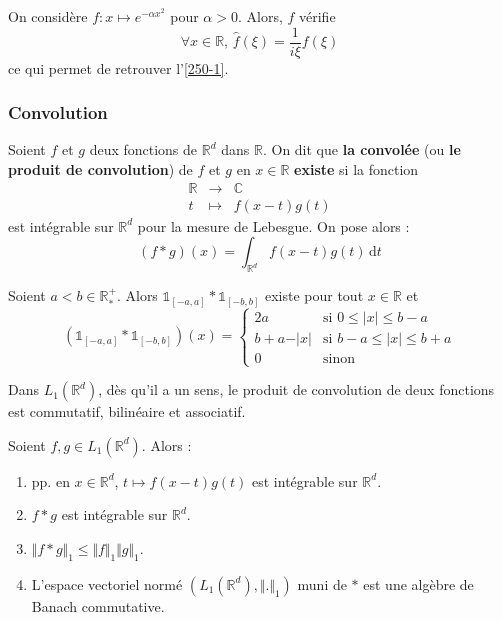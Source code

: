 
	\begin{application}
		On considère $f : x \mapsto e^{- \alpha x^2}$ pour $\alpha > 0$. Alors, $f$ vérifie
		\[ \forall x \in \mathbb{R}, \, \widehat{f}(\xi) = \frac{1}{i \xi} f(\xi) \]
		ce qui permet de retrouver l'\cref{250-1}.
	\end{application}

	\subsubsection{Convolution}


	\begin{definition}
		Soient $f$ et $g$ deux fonctions de $\mathbb{R}^d$ dans $\mathbb{R}$. On dit que \textbf{la convolée} (ou \textbf{le produit de convolution}) de $f$ et $g$ en $x \in \mathbb{R}$ \textbf{existe} si la fonction
		\[
		\begin{array}{ccc}
			\mathbb{R} &\rightarrow& \mathbb{C} \\
			t &\mapsto& f(x-t)g(t)
		\end{array}
		\]
		est intégrable sur $\mathbb{R}^d$ pour la mesure de Lebesgue. On pose alors :
		\[ (f * g)(x) = \int_{\mathbb{R}^d} f(x-t)g(t) \, \mathrm{d}t \]
	\end{definition}

	\begin{example}
		Soient $a < b \in \mathbb{R}^+_*$. Alors $\mathbb{1}_{[-a, a]} * \mathbb{1}_{[-b,b]}$ existe pour tout $x \in \mathbb{R}$ et
		\[ \left( \mathbb{1}_{[-a, a]} * \mathbb{1}_{[-b,b]} \right)(x) =
		\begin{cases}
			2a &\text{si } 0 \leq \vert x \vert \leq b-a \\
			b+a-\vert x \vert &\text{si } b-a \leq \vert x \vert \leq b+a \\
			0 &\text{sinon}
		\end{cases}
		\]
	\end{example}

	\begin{proposition}
		Dans $L_1(\mathbb{R}^d)$, dès qu'il a un sens, le produit de convolution de deux fonctions est commutatif, bilinéaire et associatif.
	\end{proposition}

	\begin{theorem}
		Soient $f, g \in L_1(\mathbb{R}^d)$. Alors :
		\begin{enumerate}[label=(\roman*)]
			\item pp. en $x \in \mathbb{R}^d$, $t \mapsto f(x-t)g(t)$ est intégrable sur $\mathbb{R}^d$.
			\item $f * g$ est intégrable sur $\mathbb{R}^d$.
			\item $\Vert f * g \Vert_1 \leq \Vert f \Vert_1 \Vert g \Vert_1$.
			\item L'espace vectoriel normé $(L_1(\mathbb{R}^d), \Vert . \Vert_1)$ muni de $*$ est une algèbre de Banach commutative.
		\end{enumerate}
	\end{theorem}

